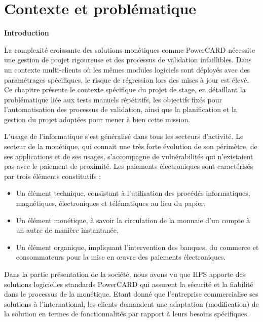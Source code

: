 \newpage
\chapter{Contexte et problématique}
\vspace{1cm}
\minitoc
\newpage

\textbf{Introduction}

La complexité croissante des solutions monétiques comme PowerCARD nécessite une gestion de projet rigoureuse et des processus de validation infaillibles. Dans un contexte multi-clients où les mêmes modules logiciels sont déployés avec des paramétrages spécifiques, le risque de régression lors des mises à jour est élevé. Ce chapitre présente le contexte spécifique du projet de stage, en détaillant la problématique liée aux tests manuels répétitifs, les objectifs fixés pour l'automatisation des processus de validation, ainsi que la planification et la gestion du projet adoptées pour mener à bien cette mission.
\vspace{10pt}

L'usage de l'informatique s'est généralisé dans tous les secteurs d'activité. Le secteur de la monétique, qui connait une très forte évolution de son périmètre, de ses applications et de ses usages, s'accompagne de vulnérabilités qui n'existaient pas avec le paiement de proximité. Les paiements électroniques sont caractérisés par trois éléments constitutifs :

\begin{itemize}[leftmargin=*]
\item Un élément technique, consistant à l'utilisation des procédés informatiques, magnétiques, électroniques et télématiques au lieu du papier,
\item Un élément monétique, à savoir la circulation de la monnaie d'un compte à un autre de manière instantanée,
\item Un élément organique, impliquant l'intervention des banques, du commerce et consommateurs pour la mise en \oe uvre des paiements électroniques.
\end{itemize}

Dans la partie présentation de la société, nous avons vu que HPS apporte des solutions logicielles standards PowerCARD qui assurent la sécurité et la fiabilité dans le processus de la monétique. Etant donné que l'entreprise commercialise ses solutions à l'international, les clients demandent une adaptation (modification) de la solution en termes de fonctionnalités par rapport à leurs besoins spécifiques.

